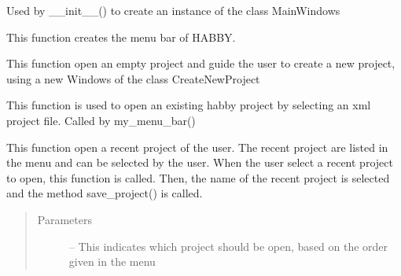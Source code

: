 \documentclass[letterpaper,10pt,english]{sphinxmanual}
\begin{document}
\begin{fulllineitems}
\begin{fulllineitems}
\end{fulllineitems}


\begin{fulllineitems}
\label{\detokenize{index:src_GUI.Main_windows_1.MainWindows.init_ui}}
Used by \_\_init\_\_() to create an instance of the class MainWindows

\end{fulllineitems}


\begin{fulllineitems}
\label{\detokenize{index:src_GUI.Main_windows_1.MainWindows.my_menu_bar}}
This function creates the menu bar of HABBY.

\end{fulllineitems}


\begin{fulllineitems}
\label{\detokenize{index:src_GUI.Main_windows_1.MainWindows.new_project}}
This function open an empty project and guide the user to create a new project, using a new Windows
of the class CreateNewProject

\end{fulllineitems}


\begin{fulllineitems}
\label{\detokenize{index:src_GUI.Main_windows_1.MainWindows.open_project}}
This function is used to open an existing habby project by selecting an xml project file. Called by
my\_menu\_bar()

\end{fulllineitems}


\begin{fulllineitems}
\label{\detokenize{index:src_GUI.Main_windows_1.MainWindows.open_recent_project}}
This function open a recent project of the user. The recent project are listed in the menu and can be
selected by the user. When the user select a recent project to open, this function is called. Then, the name of
the recent project is selected and the method save\_project() is called.
\begin{quote}\begin{description}
\item[{Parameters}] \leavevmode
{} -- This indicates which project should be open, based on the order given in the menu


\end{description}
\end{quote}
\end{fulllineitems}
\end{fulllineitems}
\end{document}
